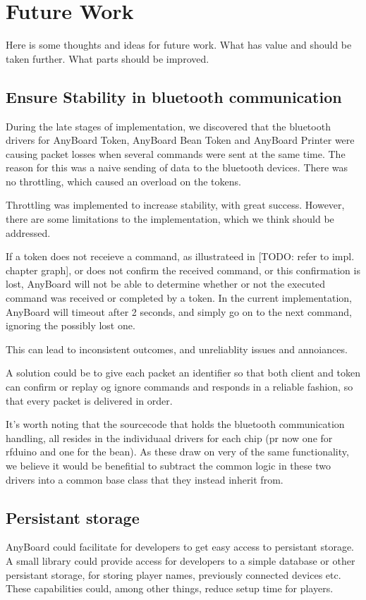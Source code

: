 \newpage

\section{Future Work} \label{sec:future_work}
Here is some thoughts and ideas for future work. What has value and should be taken further. What parts should be improved. 

\subsection{Ensure Stability in bluetooth communication}
During the late stages of implementation, we discovered that the bluetooth drivers for AnyBoard Token, AnyBoard Bean Token and AnyBoard Printer were causing packet losses when several commands were sent at the same time. The reason for this was a naive sending of data to the bluetooth devices. There was no throttling, which caused an overload on the tokens.

Throttling was implemented to increase stability, with great success. However, there are some limitations to the implementation, which we think should be addressed.

If a token does not receieve a command, as illustrateed in [TODO: refer to impl. chapter graph], or does not confirm the received command, or this confirmation is lost, AnyBoard will not be able to determine whether or not the executed command was received or completed by a token. In the current implementation, AnyBoard will timeout after 2 seconds, and simply go on to the next command, ignoring the possibly lost one.

This can lead to inconsistent outcomes, and unreliablity issues and annoiances. 

A solution could be to give each packet an identifier so that both client and token can confirm or replay og ignore commands and responds in a reliable fashion, so that every packet is delivered in order.

It's worth noting that the sourcecode that holds the bluetooth communication handling, all resides in the individuaal drivers for each chip (pr now one for rfduino and one for the bean). As these draw on very of the same functionality, we believe it would be benefitial to subtract the common logic in these two drivers into a common base class that they instead inherit from.

\subsection{Persistant storage}
AnyBoard could facilitate for developers to get easy access to persistant storage. A small library could provide access for developers to a simple database or other persistant storage, for storing player names, previously connected devices etc. These capabilities could, among other things, reduce setup time for players.

